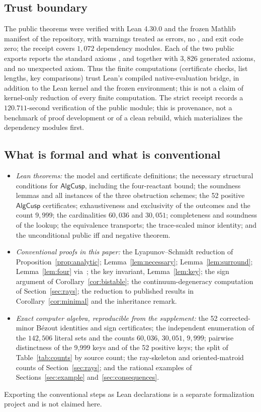 \documentclass[11pt,a4paper]{article}
\theoremstyle{plain}
\theoremstyle{definition}
\theoremstyle{remark}
\numberwithin{equation}{section}
\newcommand{\AlgCusp}{\mathsf{AlgCusp}}
\begin{document}
\subsection{Trust boundary}
The public theorems were verified with Lean 4.30.0 and the frozen Mathlib manifest of the repository, with warnings treated as errors, no , and exit code zero; the receipt covers $1{,}072$ dependency modules. Each of the two public exports reports the standard axioms ,  and  together with $3{,}826$ generated  axioms, and no unexpected axiom. Thus the finite computations (certificate checks, list lengths, key comparisons) trust Lean's compiled native-evaluation bridge, in addition to the Lean kernel and the frozen environment; this is not a claim of kernel-only reduction of every finite computation. The strict receipt records a $120.711$-second verification of the public module; this is provenance, not a benchmark of proof development or of a clean rebuild, which materializes the dependency modules first.

\subsection{What is formal and what is conventional}
\begin{itemize}
\item \emph{Lean theorems:} the model and certificate definitions; the necessary structural conditions for $\AlgCusp$, including the four-reactant bound; the soundness lemmas and all instances of the three obstruction schemes; the 52 positive $\AlgCusp$ certificates; exhaustiveness and exclusivity of the outcomes and the count $9{,}999$; the cardinalities $60{,}036$ and $30{,}051$; completeness and soundness of the lookup; the equivalence transports; the trace-scaled minor identity; and the unconditional public iff and negative theorem.
\item \emph{Conventional proofs in this paper:} the Lyapunov--Schmidt reduction of Proposition~\ref{prop:analytic}; Lemma~\ref{lem:necessary}; Lemma~\ref{lem:surround}; Lemma~\ref{lem:four} via~\citep{BF2026}; the key invariant, Lemma~\ref{lem:key}; the sign argument of Corollary~\ref{cor:bistable}; the continuum-degeneracy computation of Section~\ref{sec:rays}; the reduction to published results in Corollary~\ref{cor:minimal} and the inheritance remark.
\item \emph{Exact computer algebra, reproducible from the supplement:} the 52 corrected-minor B\'ezout identities and sign certificates; the independent enumeration of the $142{,}506$ literal sets and the counts $60{,}036$, $30{,}051$, $9{,}999$; pairwise distinctness of the 9,999 keys and of the 52 positive keys; the split of Table~\ref{tab:counts} by source count; the ray-skeleton and oriented-matroid counts of Section~\ref{sec:rays}; and the rational examples of Sections~\ref{sec:example} and~\ref{sec:consequences}.
\end{itemize}
Exporting the conventional steps as Lean declarations is a separate formalization project and is not claimed here.
\end{document}
